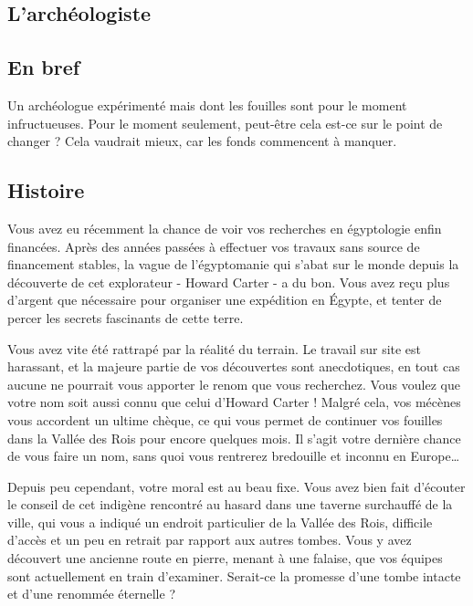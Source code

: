 \documentclass[11pt]{article}
\begin{document}
\begin{twocols}
\section{L'archéologiste}
\label{sec:org590b290}

\subsection{En bref}
\label{sec:org7051bda}

Un archéologue expérimenté mais dont les fouilles sont pour le moment infructueuses. Pour le moment seulement, peut-être cela est-ce sur le point de changer ? Cela vaudrait mieux, car les fonds commencent à manquer.

\subsection{Histoire}
\label{sec:org77f1498}

Vous avez eu récemment la chance de voir vos recherches en égyptologie enfin financées. Après des années passées à effectuer vos travaux sans source de financement stables, la vague de l'égyptomanie qui s'abat sur le monde depuis la découverte de cet explorateur - Howard Carter - a du bon. Vous avez reçu plus d'argent que nécessaire pour organiser une expédition en Égypte, et tenter de percer les secrets fascinants de cette terre. 

Vous avez vite été rattrapé par la réalité du terrain. Le travail sur site est harassant, et la majeure partie de vos découvertes sont anecdotiques, en tout cas aucune ne pourrait vous apporter le renom que vous recherchez. Vous voulez que votre nom soit aussi connu que celui d'Howard Carter ! Malgré cela, vos mécènes vous accordent un ultime chèque, ce qui vous permet de continuer vos fouilles dans la Vallée des Rois pour encore quelques mois. Il s'agit votre dernière chance de vous faire un nom, sans quoi vous rentrerez bredouille et inconnu en Europe\ldots{}

Depuis peu cependant, votre moral est au beau fixe. Vous avez bien fait d'écouter le conseil de cet indigène rencontré au hasard dans une taverne surchauffé de la ville, qui vous a indiqué un endroit particulier de la Vallée des Rois, difficile d'accès et un peu en retrait par rapport aux autres tombes. Vous y avez découvert une ancienne route en pierre, menant à une falaise, que vos équipes sont actuellement en train d'examiner. Serait-ce la promesse d'une tombe intacte et d'une renommée éternelle ? 


\end{twocols}
\end{document}
